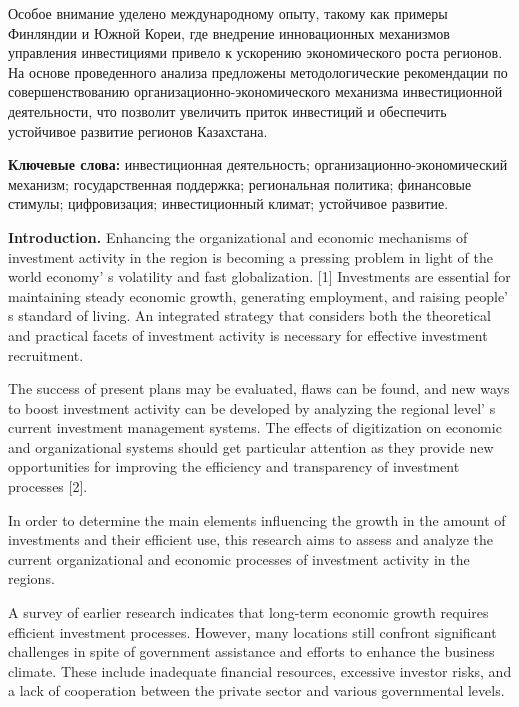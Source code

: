 Особое внимание уделено международному опыту, такому как примеры
Финляндии и Южной Кореи, где внедрение инновационных механизмов
управления инвестициями привело к ускорению экономического роста
регионов. На основе проведенного анализа предложены методологические
рекомендации по совершенствованию организационно-экономического
механизма инвестиционной деятельности, что позволит увеличить приток
инвестиций и обеспечить устойчивое развитие регионов Казахстана.

{\bfseries Ключевые слова:} инвестиционная деятельность;
организационно-экономический механизм; государственная поддержка;
региональная политика; финансовые стимулы; цифровизация; инвестиционный
климат; устойчивое развитие.

\begin{multicols}{2}
{\bfseries Introduction.} Enhancing the organizational and economic
mechanisms of investment activity in the region is becoming a pressing
problem in light of the world economy' s volatility and
fast globalization. {[}1{]} Investments are essential for maintaining
steady economic growth, generating employment, and raising
people' s standard of living. An integrated strategy that
considers both the theoretical and practical facets of investment
activity is necessary for effective investment recruitment.

The success of present plans may be evaluated, flaws can be found, and
new ways to boost investment activity can be developed by analyzing the
regional level' s current investment management systems.
The effects of digitization on economic and organizational systems
should get particular attention as they provide new opportunities for
improving the efficiency and transparency of investment processes
{[}2{]}.

In order to determine the main elements influencing the growth in the
amount of investments and their efficient use, this research aims to
assess and analyze the current organizational and economic processes of
investment activity in the regions.

A survey of earlier research indicates that long-term economic growth
requires efficient investment processes. However, many locations still
confront significant challenges in spite of government assistance and
efforts to enhance the business climate. These include inadequate
financial resources, excessive investor risks, and a lack of cooperation
between the private sector and various governmental levels.


\end{multicols}
